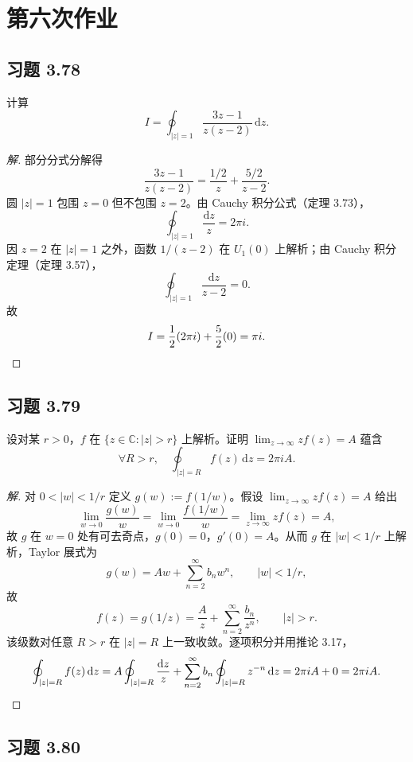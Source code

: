 \documentclass[11pt,a4paper]{article}
\newcommand{\C}{\mathbb{C}}
\newcommand{\dd}{\mathrm{d}}
\theoremstyle{definition}
\newenvironment{solution}{\begin{proof}[解]}{\end{proof}}
\begin{document}
\section{第六次作业}

\subsection{习题 3.78}

计算
\[
  I = \oint_{|z|=1} \frac{3z-1}{z(z-2)}\,\dd z.
\]

\begin{solution}
  部分分式分解得
  \[
    \frac{3z-1}{z(z-2)}
    = \frac{1/2}{z} + \frac{5/2}{z-2}.
  \]
  圆 $|z|=1$ 包围 $z=0$ 但不包围 $z=2$。由 Cauchy 积分公式（定理 3.73），
  \[
    \oint_{|z|=1}\frac{\dd z}{z} = 2\pi i.
  \]
  因 $z=2$ 在 $|z|=1$ 之外，函数 $1/(z-2)$ 在 $U_1(0)$ 上解析；由 Cauchy 积分定理（定理 3.57），
  \[
    \oint_{|z|=1}\frac{\dd z}{z-2} = 0.
  \]
  故
  \[
    I = \frac{1}{2}(2\pi i) + \frac{5}{2}(0) = \pi i.\qedhere
  \]
\end{solution}

\subsection{习题 3.79}

设对某 $r > 0$，$f$ 在 $\{z \in \C : |z| > r\}$ 上解析。证明 $\lim_{z\to\infty} z f(z) = A$ 蕴含
\[
  \forall R > r,\quad \oint_{|z|=R} f(z)\,\dd z = 2\pi i A.
\]

\begin{solution}
  对 $0 < |w| < 1/r$ 定义 $g(w) := f(1/w)$。假设 $\lim_{z\to\infty}zf(z) = A$ 给出
  \[
    \lim_{w\to 0}\frac{g(w)}{w}
    = \lim_{w\to 0}\frac{f(1/w)}{w}
    = \lim_{z\to\infty}zf(z) = A,
  \]
  故 $g$ 在 $w=0$ 处有可去奇点，$g(0)=0$，$g'(0)=A$。从而 $g$ 在 $|w|<1/r$ 上解析，Taylor 展式为
  \[
    g(w) = Aw + \sum_{n=2}^{\infty}b_n w^n,\qquad |w|<1/r,
  \]
  故
  \[
    f(z) = g(1/z) = \frac{A}{z}
    + \sum_{n=2}^{\infty}\frac{b_n}{z^n},
    \qquad |z|>r.
  \]
  该级数对任意 $R>r$ 在 $|z|=R$ 上一致收敛。逐项积分并用推论 3.17，
  \[
    \oint_{|z|=R}f(z)\,\dd z
    = A\oint_{|z|=R}\frac{\dd z}{z}
    + \sum_{n=2}^{\infty}b_n\oint_{|z|=R}z^{-n}\,\dd z
    = 2\pi iA + 0 = 2\pi iA.\qedhere
  \]
\end{solution}

\subsection{习题 3.80}
\end{document}
